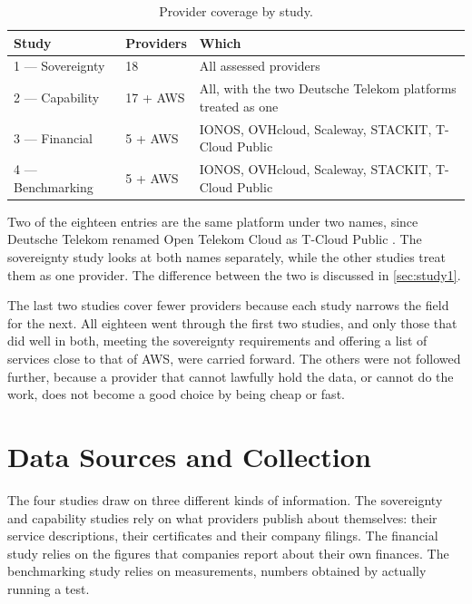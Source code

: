 \begin{table}[htbp]
  \centering
  \caption{Provider coverage by study.}
  \label{tab:study-coverage}
  \small
  \begin{tabularx}{\textwidth}{@{}l l X@{}}
    \toprule
    \textbf{Study} & \textbf{Providers} & \textbf{Which} \\
    \midrule
    1 --- Sovereignty
      & 18
      & All assessed providers \\[0.35em]
    2 --- Capability
      & 17 + \acs{AWS}
      & All, with the two Deutsche Telekom platforms treated as one \\[0.35em]
    3 --- Financial
      & 5 + \acs{AWS}
      & IONOS, OVHcloud, Scaleway, STACKIT, T-Cloud Public \\[0.35em]
    4 --- Benchmarking
      & 5 + \acs{AWS}
      & IONOS, OVHcloud, Scaleway, STACKIT, T-Cloud Public \\
    \bottomrule
  \end{tabularx}
\end{table}

Two of the eighteen entries are the same platform under two names, since Deutsche
Telekom renamed Open Telekom Cloud as T-Cloud Public \cite{TCloudPublic_2026}. The
sovereignty study looks at both names separately, while the other studies treat
them as one provider. The difference between the two is discussed in
\cref{sec:study1}.

The last two studies cover fewer providers because each study narrows the field for
the next. All eighteen went through the first two studies, and only those that did
well in both, meeting the sovereignty requirements and offering a list of services
close to that of \acs{AWS}, were carried forward. The others were not followed
further, because a provider that cannot lawfully hold the data, or cannot do the
work, does not become a good choice by being cheap or fast.

\section{Data Sources and Collection}
\label{sec:evidence-standards}

The four studies draw on three different kinds of information. The sovereignty and
capability studies rely on what providers publish about themselves: their service
descriptions, their certificates and their company filings. The financial study
relies on the figures that companies report about their own finances. The
benchmarking study relies on measurements, numbers obtained by actually running a
test.

